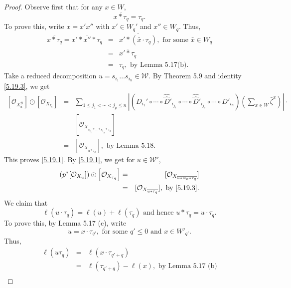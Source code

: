 \documentclass{article}
\def\B{\mathcal{B}}
\def\W{\mathcal{W}}
\def\ref#1{#1}
\begin{document}
\begin{proof}
Observe first that for any $x\in W$, 
\begin{equation}\label{5.19.3}
\overline{x*\tau_q}= \tau_q.
\end{equation}
To prove this, write $x=x'x''$ with $x'\in W_q'$ and $x''\in W_q$. 
Thus,
\begin{eqnarray*}
\overline{x*\tau_q} =\overline{x'*x''*\tau_q}&=& \overline{x'*\left(\bar{x}\cdot \tau_q\right)},\mbox{ for some $\bar{x}\in W_q$}\\
&=& \overline{x'*\tau_q}\\
&=& \tau_q, \mbox{ by Lemma \ref{5.17}(b).}
\end{eqnarray*}
Take a reduced decomposition $u=s_{i_1}\ldots s_{i_n} \in \W$.
By Theorem \ref{5.9} and identity \eqref{5.19.3}, we get 
\begin{eqnarray*}
\left[\mathcal{O}_{X_u^\B}\right]\odot \left[\mathcal{O}_{X_{\tau_q}}\right] &=& \sum_{1\leq j_1 <\cdots < j_{p}\leq n} \left \vert \left( D_{i_1}'\circ \cdots \circ \hat{\hat{D}}'_{i_{j_1}}\circ \cdots \circ  \hat{\hat{D}}'_{i_{j_p}} \circ \cdots \circ  D'_{i_n}\right) 
 (\sum_{x\in W} \bar\zeta^x)\right\vert \cdot \\
 && [\mathcal{O}_{X_{\overline{s_{i_{j_1}}*\cdots * s_{i_{j_p}}*\tau_q}}}]\\
&=& [\mathcal{O}_{X_{\overline{u*\tau_q}}}], \mbox{ by Lemma \ref{5.18}.}
\end{eqnarray*}
This proves \eqref{5.19.1}. 
By  \eqref{5.19.1}, we get for $u\in \W'$, 
\begin{eqnarray*}\label{5.19.4}
\left(p^*[\mathcal{O}_{X_u}]\right) \odot\left[\mathcal{O}_{X_{\tau_q}}\right]&=&[ \mathcal{O}_{X_{\overline{u*w_o*\tau_q}}}]\\
&=&[ \mathcal{O}_{X_{\overline{u*\tau_q}}}],\mbox{ by \eqref{5.19.3}.}
\end{eqnarray*}
We claim that 
\begin{equation}\label{5.19.5}
\ell(u\cdot \tau_q) = \ell(u)+\ell(\tau_q)\mbox{ and hence } u*\tau_q =u\cdot \tau_q.
\end{equation}
To prove this, by Lemma \ref{5.17} (c), write 
\begin{equation}\label{5.19.6}
u=x\cdot \tau_{q'},  \mbox{ for some } q'\leq 0 \mbox{ and } x\in W'_{q'}. 
\end{equation}
Thus, 
\begin{eqnarray*}
\ell\left( u\tau_q\right) &=& \ell\left( x\cdot \tau_{q'+q}\right)\\
&=& \ell\left( \tau_{q'+q}\right) -\ell(x),\mbox{ by Lemma \ref{5.17} (b)}\\

\end{eqnarray*}
\end{proof}
\end{document}
